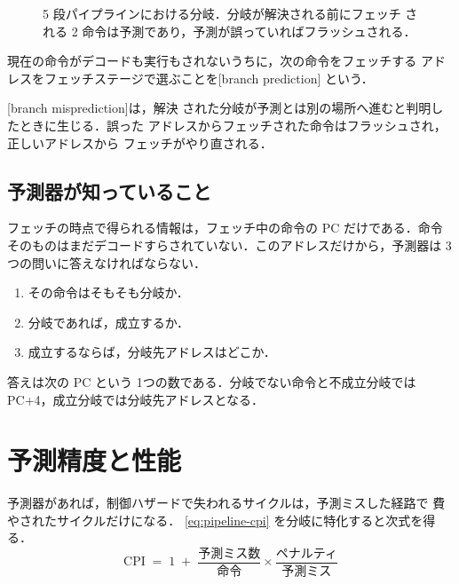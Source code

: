 \documentclass[../main.tex]{subfiles}
\begin{document}
\begin{figure}[htbp]
  \centering
  
  \caption{5 段パイプラインにおける分岐．分岐が解決される前にフェッチ
    される 2 命令は予測であり，予測が誤っていればフラッシュされる．}
  \label{fig:l04-branch-pipeline}
\end{figure}

\begin{definition}[分岐予測]
  \label{def:l04-branch-prediction}
  現在の命令がデコードも実行もされないうちに，次の命令をフェッチする
  アドレスをフェッチステージで選ぶことを[branch prediction]%
  という．
\end{definition}

\begin{definition}[予測ミス]
  [branch misprediction]は，解決
  された分岐が予測とは別の場所へ進むと判明したときに生じる．誤った
  アドレスからフェッチされた命令はフラッシュされ，正しいアドレスから
  フェッチがやり直される．
\end{definition}

\subsection{予測器が知っていること}

フェッチの時点で得られる情報は，フェッチ中の命令の PC だけである．命令
そのものはまだデコードすらされていない．このアドレスだけから，予測器は
3つの問いに答えなければならない．
\begin{enumerate}
  \item その命令はそもそも分岐か．
  \item 分岐であれば，成立するか．
  \item 成立するならば，分岐先アドレスはどこか．
\end{enumerate}
答えは次の PC という 1つの数である．分岐でない命令と不成立分岐では
PC+4，成立分岐では分岐先アドレスとなる．

\section{予測精度と性能}
\label{sec:l04-accuracy}

予測器があれば，制御ハザードで失われるサイクルは，予測ミスした経路で
費やされたサイクルだけになる．%
\cref{eq:pipeline-cpi} を分岐に特化すると次式を得る．
\begin{equation}
  \text{CPI} \;=\; 1 \;+\;
  \frac{\text{予測ミス数}}{\text{命令}} \times
  \frac{\text{ペナルティ}}{\text{予測ミス}}
  \label{eq:l04-cpi}
\end{equation}
\end{document}
